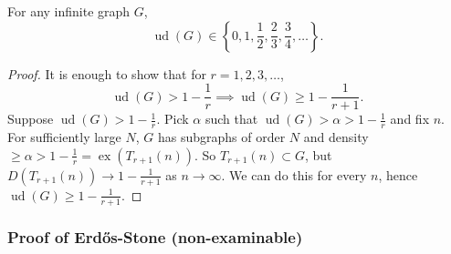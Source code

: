 \documentclass{article}
\DeclareMathOperator{\ext}{ex}
\DeclareMathOperator{\ud}{ud}
\begin{document}
\begin{ncor}
    For any infinite graph $G$,
    \begin{equation*}
        \ud(G) \in \left\{0, 1, \frac{1}{2}, \frac{2}{3}, \frac{3}{4}, \dotsc\right\}.
    \end{equation*}
\end{ncor}
\begin{proof}
    It is enough to show that for $r = 1, 2, 3, \dotsc$,
    \begin{equation*}
        \ud(G) > 1 - \frac{1}{r} \implies \ud(G) \geq 1 - \frac{1}{r+1}.
    \end{equation*}
    Suppose $\ud(G) > 1 - \frac{1}{r}$.
    Pick $\alpha$ such that $\ud(G) > \alpha > 1 - \frac{1}{r}$ and fix $n$.
    For sufficiently large $N$, $G$ has subgraphs of order $N$ and density $\geq \alpha > 1 - \frac{1}{r} = \ext(T_{r+1}(n))$.
    So $T_{r+1}(n) \subset G$, but $D(T_{r+1}(n)) \to 1 - \frac{1}{r+1}$ as $n \to \infty$.
    We can do this for every $n$, hence $\ud(G) \geq 1 - \frac{1}{r+1}$.
\end{proof}
\subsubsection{Proof of Erd\H{o}s-Stone (non-examinable)}\label{sec:es}
\end{document}
